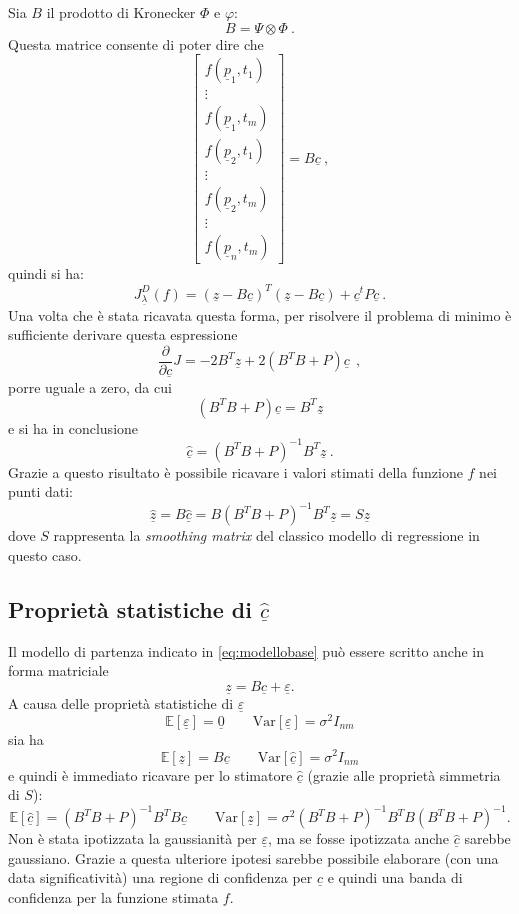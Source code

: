 \documentclass[a4paper,11pt,twoside,openright]{book}							%
\begin{document}
Sia $B$ il prodotto di Kronecker $\Phi$ e $\varphi$:
$$ B = \Psi \otimes \Phi \ .$$
Questa matrice consente di poter dire che
\begin{equation}
\begin{bmatrix}
f(\underline p_1,t_1)  \\
\vdots\\
f(\underline p_1,t_m)  \\
f(\underline p_2,t_1)  \\
\vdots\\
f(\underline p_2,t_m)  \\
\vdots\\
f(\underline p_n,t_m)
\end{bmatrix}= B \underline c \ ,
\end{equation} 
quindi si ha:
\begin{equation} 
\label{eq:Jmatr}
J_{\underline \lambda }^D(f) = (\underline z - B \underline c)^T (\underline z - B \underline c) + \underline c^t P \underline c \ .
\end{equation}
Una volta che è stata ricavata questa forma, per risolvere il problema di minimo è sufficiente derivare questa espressione
$$
\frac{\partial}{\partial \underline c}J= -2 B^T \underline z + 2(B^T B + P) \underline c \ \ ,
$$
porre uguale a zero, da cui
\begin{equation}
(B^T B + P) \underline c = B^T\underline z
\end{equation} 
e si ha in conclusione
$$ \hat  {\underline c} = (B^T B + P)^{-1}B^T \underline z \ .$$
Grazie a questo risultato è possibile ricavare i valori stimati della funzione $f$ nei punti dati:
$$
\hat  {\underline z} =B\hat  {\underline c} = B(B^T B + P)^{-1}B^T \underline z = S\underline{z}
$$
dove $S$ rappresenta la \textit{smoothing matrix} del classico modello di regressione in questo caso.


\subsection*{Proprietà statistiche di $\hat  {\underline c}$}
Il modello di partenza indicato in \ref{eq:modellobase} può essere scritto anche in forma matriciale
\begin{equation}
\label{eq:modellobasematric}
\underline z=B \underline c + \underline \varepsilon .
\end{equation}
A causa delle proprietà statistiche di $\underline \varepsilon$
$$
\mathbb{E}[\underline \varepsilon] = \underline 0 \qquad \mathrm{Var}[\underline \varepsilon] = \sigma^2 I_{nm}
$$
sia ha
$$
\mathbb{E}[\underline z] = B \underline c \qquad \mathrm{Var}[\hat  {\underline c}] = \sigma^2 I_{nm}
$$
e quindi è immediato ricavare per lo stimatore $\hat  {\underline c}$ (grazie alle proprietà simmetria di $S$):
$$
\mathbb{E}[\hat  {\underline c}] = (B^T B + P)^{-1}B^TB \underline c \qquad \mathrm{Var}[\underline z] = \sigma^2 (B^T B + P)^{-1}B^TB(B^T B + P)^{-1} .
$$
Non è stata ipotizzata la gaussianità per $\underline \varepsilon$, ma se fosse ipotizzata anche $\hat  {\underline c}$ sarebbe gaussiano. Grazie a questa ulteriore ipotesi sarebbe possibile elaborare (con una data significatività) una regione di confidenza per $\hat  {\underline c}$ e quindi una banda di confidenza per la funzione stimata $f$.
\end{document}
